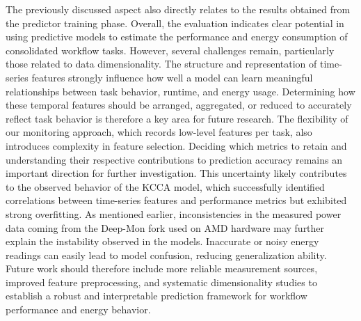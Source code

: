 The previously discussed aspect also directly relates to the results obtained from the predictor training phase. Overall, the evaluation indicates clear potential in using predictive models to estimate the performance and energy consumption of consolidated workflow tasks. However, several challenges remain, particularly those related to data dimensionality. The structure and representation of time-series features strongly influence how well a model can learn meaningful relationships between task behavior, runtime, and energy usage. Determining how these temporal features should be arranged, aggregated, or reduced to accurately reflect task behavior is therefore a key area for future research.
The flexibility of our monitoring approach, which records low-level features per task, also introduces complexity in feature selection. Deciding which metrics to retain and understanding their respective contributions to prediction accuracy remains an important direction for further investigation. This uncertainty likely contributes to the observed behavior of the KCCA model, which successfully identified correlations between time-series features and performance metrics but exhibited strong overfitting.
As mentioned earlier, inconsistencies in the measured power data coming from the Deep-Mon fork used on AMD hardware may further explain the instability observed in the models. Inaccurate or noisy energy readings can easily lead to model confusion, reducing generalization ability. Future work should therefore include more reliable measurement sources, improved feature preprocessing, and systematic dimensionality studies to establish a robust and interpretable prediction framework for workflow performance and energy behavior.

